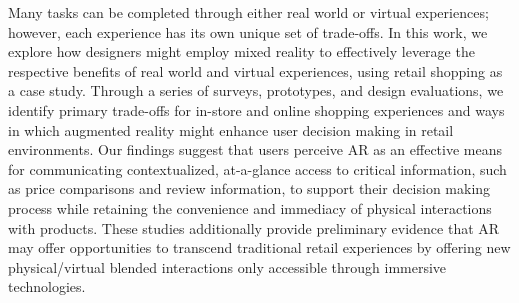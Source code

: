 Many tasks can be completed through either real world or virtual experiences; however, each experience has its own unique set of trade-offs. In this work, we explore how designers might employ mixed reality to effectively leverage the respective benefits of real world and virtual experiences, using retail shopping as a case study. Through a series of surveys, prototypes, and design evaluations, we identify primary trade-offs for in-store and online shopping experiences and ways in which augmented reality might enhance user decision making in retail environments. 
Our findings suggest that users perceive AR as an effective means for communicating contextualized, at-a-glance access to critical information, such as price comparisons and review information, to support their decision making process while retaining the convenience and immediacy of physical interactions with products.  These studies additionally provide preliminary evidence that AR may offer opportunities to transcend traditional retail experiences by offering new physical/virtual blended interactions only accessible through immersive technologies.
